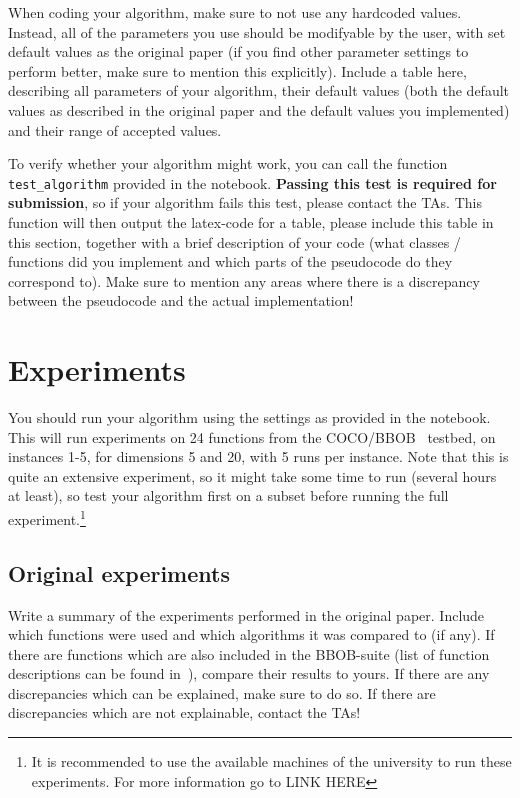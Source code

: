 \documentclass[runningheads]{llncs}
\begin{document}
When coding your algorithm, make sure to not use any hardcoded values. Instead, all of the parameters you use should be modifyable by the user, with set default values as the original paper (if you find other parameter settings to perform better, make sure to mention this explicitly). Include a table here, describing all parameters of your algorithm, their default values (both the default values as described in the original paper and the default values you implemented) and their range of accepted values. 

To verify whether your algorithm might work, you can call the function \verb!test_algorithm! provided in the notebook. \textbf{Passing this test is required for submission}, so if your algorithm fails this test, please contact the TAs. This function will then output the latex-code for a table, please include this table in this section, together with a brief description of your code (what classes / functions did you implement and which parts of the pseudocode do they correspond to). Make sure to mention any areas where there is a discrepancy between the pseudocode and the actual implementation!

\section{Experiments}
You should run your algorithm using the settings as provided in the notebook. This will run experiments on 24 functions from the COCO/BBOB~\cite{COCO} testbed, on instances 1-5, for dimensions 5 and 20, with 5 runs per instance. Note that this is quite an extensive experiment, so it might take some time to run (several hours at least), so test your algorithm first on a subset before running the full experiment.\footnote{It is recommended to use the available machines of the university to run these experiments. For more information go to LINK HERE}

\subsection{Original experiments}
Write a summary of the experiments performed in the original paper. Include which functions were used and which algorithms it was compared to (if any). If there are functions which are also included in the BBOB-suite (list of function descriptions can be found in~\cite{finck2010real}), compare their results to yours. If there are any discrepancies which can be explained, make sure to do so. If there are discrepancies which are not explainable, contact the TAs!
\end{document}
